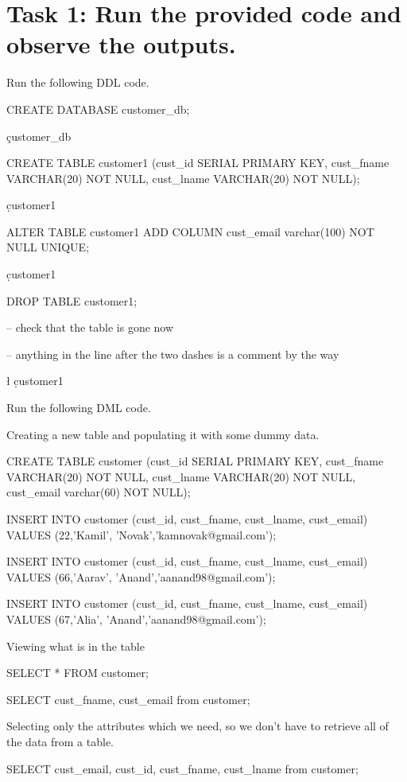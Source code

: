 
\section*{Task 1: Run the provided code and observe the outputs.}
Run the following DDL code.
\begin{sql}
CREATE DATABASE customer_db;

\c customer_db

CREATE TABLE customer1 (cust_id SERIAL PRIMARY KEY, cust_fname VARCHAR(20) NOT NULL, cust_lname VARCHAR(20) NOT NULL);

\d customer1

ALTER TABLE customer1 ADD COLUMN cust_email varchar(100) NOT NULL UNIQUE;

\d customer1

DROP TABLE customer1;

-- check that the table is gone now

-- anything in the line after the two dashes is a comment by the way

\l
\d customer1
\end{sql}

Run the following DML code.

Creating a new table and populating it with some dummy data.
\begin{sql}
CREATE TABLE customer (cust_id SERIAL PRIMARY KEY, cust_fname VARCHAR(20) NOT NULL, cust_lname VARCHAR(20) NOT NULL, cust_email varchar(60) NOT NULL);

INSERT INTO customer (cust_id, cust_fname, cust_lname, cust_email) VALUES (22,'Kamil', 'Novak','kamnovak@gmail.com');

INSERT INTO customer (cust_id, cust_fname, cust_lname, cust_email) VALUES (66,'Aarav', 'Anand','aanand98@gmail.com');

INSERT INTO customer (cust_id, cust_fname, cust_lname, cust_email) VALUES (67,'Alia', 'Anand','aanand98@gmail.com');
\end{sql}

Viewing what is in the table
\begin{sql}
SELECT * FROM customer;

SELECT cust_fname, cust_email from customer;
\end{sql}
Selecting only the attributes which we need, so we don't have to retrieve all of the data from a table.
\begin{sql}
SELECT cust_email, cust_id, cust_fname, cust_lname from customer;
\end{sql}

